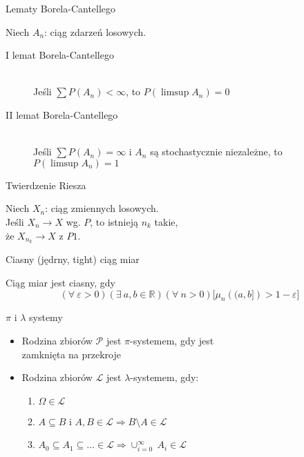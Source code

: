 \documentclass[avery5371,grid,frame]{flashcards}
\begin{document}


\begin{flashcard}[Twierdzenie]{Lematy Borela-Cantellego}

\smallskip
Niech $A_n$: ciąg zdarzeń losowych.
\begin{description}
\item[I lemat Borela-Cantellego] \hfill \\
	Jeśli $\sum P(A_n) < \infty$, to $P\left(\limsup{A_n}\right)=0$
\item[II lemat Borela-Cantellego] \hfill \\
	Jeśli $\sum P(A_n) = \infty$ i $A_n$ są stochastycznie niezależne, to $P\left(\limsup{A_n}\right)=1$ 
\end{description}
\end{flashcard}

\begin{flashcard}[Twierdzenie]{Twierdzenie Riesza}

\smallskip
Niech $X_n$: ciąg zmiennych losowych. \\ 
Jeśli $X_n \rightarrow X$ wg. $P$, to istnieją $n_k$ takie, \\
że $X_{n_k} \rightarrow X$ z $P1$.
\end{flashcard}

\begin{flashcard}[Definicja]{Ciasny (jędrny, tight) ciąg miar}

\smallskip
Ciąg miar jest ciasny, gdy
$$ (\forall \ \varepsilon > 0)(\exists \ a, b \in \mathbb{R})(\forall \ n > 0) \Big[\mu_n \left( (a,b] \right) > 1-\varepsilon \Big] $$
\end{flashcard}

\begin{flashcard}[Definicja]{$\pi$ i $\lambda$ systemy}

\smallskip
\begin{itemize}
\item Rodzina zbiorów $\mathcal{P}$ jest $\pi$-systemem, gdy jest \\
zamknięta na przekroje
\item Rodzina zbiorów $\mathcal{L}$ jest $\lambda$-systemem, gdy:
	\begin{enumerate}
	\item $\Omega \in \mathcal{L}$
	\item $A \subseteq B$ i $A, B \in \mathcal{L} \Rightarrow B \setminus A \in \mathcal{L}$
	\item $A_0 \subseteq A_1 \subseteq \ldots \in \mathcal{L} \Rightarrow \cup^{\infty}_{i=0} \ A_i \in \mathcal{L}$
	\end{enumerate}

\end{itemize}
\end{flashcard}
\end{document}
